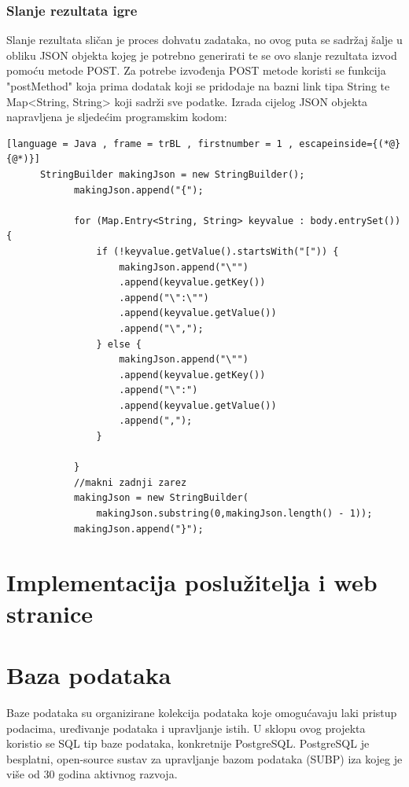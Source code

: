 \documentclass[times, utf8, zavrsni]{fer}
\begin{document}
	\subsection{Slanje rezultata igre}
	Slanje rezultata sličan je proces dohvatu zadataka, no ovog puta se sadržaj šalje u obliku JSON objekta kojeg je potrebno generirati te se ovo slanje rezultata izvod pomoću metode POST. 
	Za potrebe izvođenja POST metode koristi se funkcija "postMethod" koja prima dodatak koji se pridodaje na bazni link tipa String te Map<String, String> koji sadrži sve podatke. 
	Izrada cijelog JSON objekta napravljena je sljedećim programskim kodom:
	\begin{lstlisting}[language = Java , frame = trBL , firstnumber = 1 , escapeinside={(*@}{@*)}]
	  StringBuilder makingJson = new StringBuilder();
            makingJson.append("{");

            for (Map.Entry<String, String> keyvalue : body.entrySet()) {
                if (!keyvalue.getValue().startsWith("[")) {
                    makingJson.append("\"")
					.append(keyvalue.getKey())
					.append("\":\"")
					.append(keyvalue.getValue())
					.append("\",");
                } else {
                    makingJson.append("\"")
					.append(keyvalue.getKey())
					.append("\":")
					.append(keyvalue.getValue())
					.append(",");
                }

            }
            //makni zadnji zarez
            makingJson = new StringBuilder(
				makingJson.substring(0,makingJson.length() - 1));
            makingJson.append("}");
	\end{lstlisting}
	
	
	
\chapter{Implementacija poslužitelja i web stranice}
		
	

\chapter{Baza podataka}
	Baze podataka su organizirane kolekcija podataka koje omogućavaju laki pristup podacima, uređivanje podataka i upravljanje istih. U sklopu ovog projekta koristio se
	SQL tip baze podataka, konkretnije PostgreSQL. PostgreSQL je besplatni, open-source sustav za upravljanje bazom podataka (SUBP) iza kojeg je više od 30 godina aktivnog razvoja.
	
\end{document}
